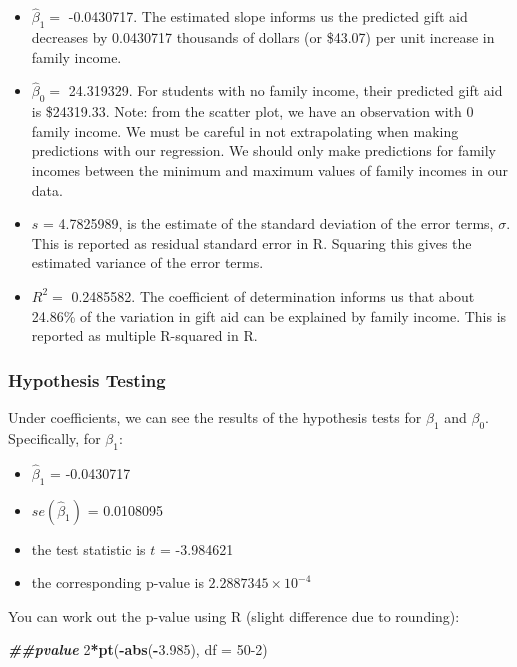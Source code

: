 \documentclass[
]{book}
\newenvironment{Shaded}{\begin{snugshade}}{\end{snugshade}}
\newcommand{\AttributeTok}[1]{\textcolor[rgb]{0.13,0.29,0.53}{#1}}
\newcommand{\DecValTok}[1]{\textcolor[rgb]{0.00,0.00,0.81}{#1}}
\newcommand{\DocumentationTok}[1]{\textcolor[rgb]{0.56,0.35,0.01}{\textbf{\textit{#1}}}}
\newcommand{\FloatTok}[1]{\textcolor[rgb]{0.00,0.00,0.81}{#1}}
\newcommand{\FunctionTok}[1]{\textcolor[rgb]{0.13,0.29,0.53}{\textbf{#1}}}
\newcommand{\NormalTok}[1]{#1}
\newcommand{\SpecialCharTok}[1]{\textcolor[rgb]{0.81,0.36,0.00}{\textbf{#1}}}
\providecommand{\tightlist}{%
  \setlength{\itemsep}{0pt}\setlength{\parskip}{0pt}}
\begin{document}
\begin{itemize}
\tightlist
\item
  \(\hat{\beta}_1 =\) -0.0430717. The estimated slope informs us the predicted gift aid decreases by 0.0430717 thousands of dollars (or \$43.07) per unit increase in family income.
\item
  \(\hat{\beta}_0 =\) 24.319329. For students with no family income, their predicted gift aid is \$24319.33. Note: from the scatter plot, we have an observation with 0 family income. We must be careful in not extrapolating when making predictions with our regression. We should only make predictions for family incomes between the minimum and maximum values of family incomes in our data.
\item
  \(s\) = 4.7825989, is the estimate of the standard deviation of the error terms, \(\sigma\). This is reported as residual standard error in R. Squaring this gives the estimated variance of the error terms.
\item
  \(R^2 =\) 0.2485582. The coefficient of determination informs us that about 24.86\% of the variation in gift aid can be explained by family income. This is reported as multiple R-squared in R.
\end{itemize}

\hypertarget{hypothesis-testing-2}{%
\subsubsection*{Hypothesis Testing}\label{hypothesis-testing-2}}

Under coefficients, we can see the results of the hypothesis tests for \(\beta_1\) and \(\beta_0\). Specifically, for \(\beta_1\):

\begin{itemize}
\tightlist
\item
  \(\hat{\beta}_1\) = -0.0430717
\item
  \(se(\hat{\beta}_1)\) = 0.0108095
\item
  the test statistic is \(t\) = -3.984621
\item
  the corresponding p-value is \ensuremath{2.2887345\times 10^{-4}}
\end{itemize}

You can work out the p-value using R (slight difference due to rounding):

\begin{Shaded}
\begin{Highlighting}[]
\DocumentationTok{\#\#pvalue}
\DecValTok{2}\SpecialCharTok{*}\FunctionTok{pt}\NormalTok{(}\SpecialCharTok{{-}}\FunctionTok{abs}\NormalTok{(}\SpecialCharTok{{-}}\FloatTok{3.985}\NormalTok{), }\AttributeTok{df =} \DecValTok{50{-}2}\NormalTok{)}
\end{Highlighting}
\end{Shaded}
\end{document}

